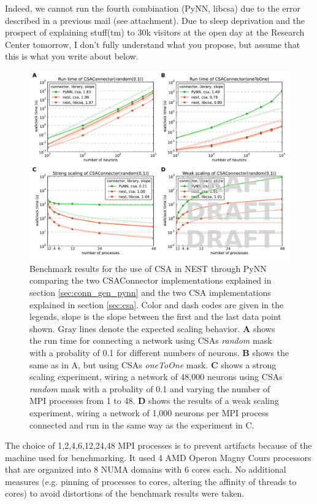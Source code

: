 \documentclass{frontiersSCNS} %
\begin{document}
Indeed, we cannot run the fourth combination (PyNN, libcsa) due to the
error described in a previous mail (see attachment). Due to sleep
deprivation and the prospect of explaining stuff(tm) to 30k visitors
at the open day at the Research Center tomorrow, I don't fully
understand what you propose, but assume that this is what you write
about below.

\begin{figure}[ht]
\centering
\includegraphics[scale=.7]{benchmarks/CSAConnector/CSAConnector.pdf}
\caption{Benchmark results for the use of CSA in NEST through PyNN
  comparing the two CSAConnector implementations explained in section
  \ref{sec:conn_gen_pynn} and the two CSA implementations explained in
  section \ref{sec:csa}. Color and dash codes are given in the
  legends, slope is the slope between the first and the last data
  point shown. Gray lines denote the expected scaling behavior.
  \textbf{A} shows the run time for connecting a network using CSAs
  \emph{random} mask with a probality of 0.1 for different numbers of
  neurons. \textbf{B} shows the same as in A, but using CSAs
  \emph{oneToOne} mask. \textbf{C} shows a strong scaling experiment,
  wiring a network of 48,000 neurons using CSAs \emph{random} mask
  with a probality of 0.1 and varying the number of MPI processes from
  1 to 48. \textbf{D} shows the results of a weak scaling experiment,
  wiring a network of 1,000 neurons per MPI process connected and run
  in the same way as the experiment in C.}\label{fig:pynn_benchmarks}
\end{figure}

The choice of 1,2,4,6,12,24,48 MPI processes is to prevent artifacts
because of the machine used for benchmarking. It used 4 AMD Operon
Magny Cours processors that are organized into 8 NUMA domains with 6
cores each. No additional measures (e.g. pinning of processes to
cores, altering the affinity of threads to cores) to avoid distortions
of the benchmark results were taken.
\end{document}
